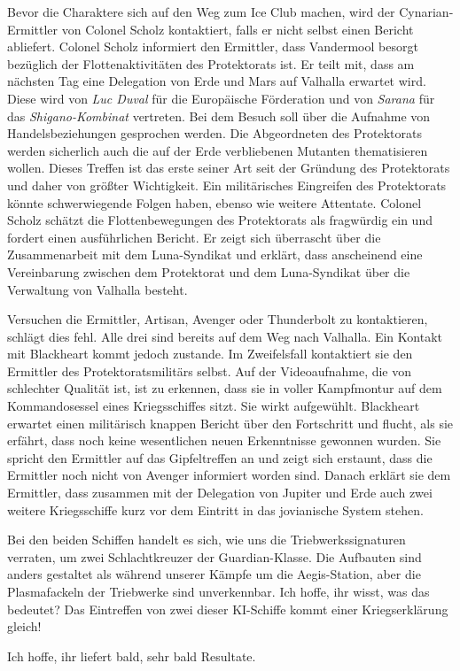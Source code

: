 Bevor die Charaktere sich auf den Weg zum Ice Club machen, wird der Cynarian-Ermittler von Colonel Scholz kontaktiert, falls er nicht selbst einen Bericht abliefert. Colonel Scholz informiert den Ermittler, dass Vandermool besorgt bezüglich der Flottenaktivitäten des Protektorats ist. Er teilt mit, dass am nächsten Tag eine Delegation von Erde und Mars auf Valhalla erwartet wird. Diese wird von 
\emph{Luc Duval} für die Europäische Förderation und von \emph{Sarana} für das \emph{Shigano-Kombinat} vertreten. Bei dem Besuch soll über die Aufnahme von Handelsbeziehungen gesprochen werden. Die Abgeordneten des Protektorats werden sicherlich auch die auf der Erde verbliebenen Mutanten thematisieren wollen. Dieses Treffen ist das erste seiner Art seit der Gründung des Protektorats und daher von größter Wichtigkeit. Ein militärisches Eingreifen des Protektorats könnte schwerwiegende Folgen haben, ebenso wie weitere Attentate. Colonel Scholz schätzt die Flottenbewegungen des Protektorats als fragwürdig ein und fordert einen ausführlichen Bericht. Er zeigt sich überrascht über die Zusammenarbeit mit dem Luna-Syndikat und erklärt, dass anscheinend eine Vereinbarung zwischen dem Protektorat und dem Luna-Syndikat über die Verwaltung von Valhalla besteht.


Versuchen die Ermittler, Artisan, Avenger oder Thunderbolt zu kontaktieren, schlägt dies fehl. Alle drei sind bereits auf dem Weg nach Valhalla. Ein Kontakt mit Blackheart kommt jedoch zustande. Im Zweifelsfall kontaktiert sie den Ermittler des Protektoratsmilitärs selbst. Auf der Videoaufnahme, die von schlechter Qualität ist, ist zu erkennen, dass sie in voller Kampfmontur auf dem Kommandosessel eines Kriegsschiffes sitzt. Sie wirkt aufgewühlt. Blackheart erwartet einen militärisch knappen Bericht über den Fortschritt und flucht, als sie erfährt, dass noch keine wesentlichen neuen Erkenntnisse gewonnen wurden. Sie spricht den Ermittler auf das Gipfeltreffen an und zeigt sich erstaunt, dass die Ermittler noch nicht von Avenger informiert worden sind. Danach erklärt sie dem Ermittler, dass zusammen mit der Delegation von Jupiter und Erde auch zwei weitere Kriegsschiffe kurz vor dem Eintritt in das jovianische System stehen.

\begin{speech}
	Bei den beiden Schiffen handelt es sich, wie uns die Triebwerkssignaturen verraten, um zwei Schlachtkreuzer der Guardian-Klasse. Die Aufbauten sind anders gestaltet als während unserer Kämpfe um die Aegis-Station, aber die Plasmafackeln der Triebwerke sind unverkennbar. Ich hoffe, ihr wisst, was das bedeutet? Das Eintreffen von zwei dieser KI-Schiffe kommt einer Kriegserklärung gleich!

	Ich hoffe, ihr liefert bald, sehr bald Resultate.
\end{speech}

